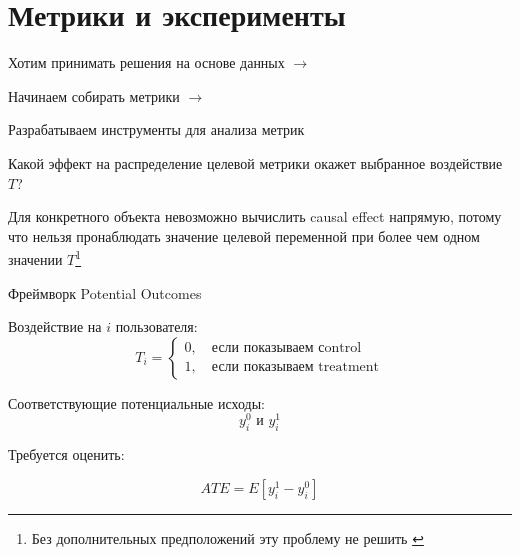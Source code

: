\documentclass[11pt,aspectratio=169]{beamer}
\begin{document}
\section{Метрики и эксперименты}

\begin{frame}{}

Хотим принимать решения на основе данных $\rightarrow$ 

\qquad Начинаем собирать метрики $\rightarrow$ 

\qquad \qquad Разрабатываем инструменты для анализа метрик

\end{frame}

\begin{frame}{}

\begin{tcolorbox}[colback=info!5,colframe=info!80,title=Задача]
Какой эффект на распределение целевой метрики окажет выбранное воздействие $T$?
\end{tcolorbox}

\vfill

\begin{tcolorbox}[colback=warn!5,colframe=warn!80,title=Фундаментальная Проблема Causal Inference]
Для конкретного объекта невозможно вычислить causal effect напрямую, потому что нельзя пронаблюдать значение целевой переменной при более чем одном значении $T$\footnote{Без дополнительных предположений эту проблему не решить \cite{GELMAN}}
\end{tcolorbox}

\end{frame}

\begin{frame}{Фреймворк Potential Outcomes}

Воздействие на $i$ пользователя:
\[
T_i = \begin{cases}
0, \quad \text{если показываем сontrol} \\
1, \quad \text{если показываем treatment}
\end{cases}
\]

Соответствующие потенциальные исходы:
\[
y_i^0 \text{ и } y_i^1
\]

Требуется оценить:
\begin{tcolorbox}[colback=info!5,colframe=info!80,title=Average Treatment Effect,center,width=6cm,center title]
\[
ATE = E \left[ y_i^1 - y_i^0 \right]
\]
\end{tcolorbox}

\end{frame}
\end{document}
